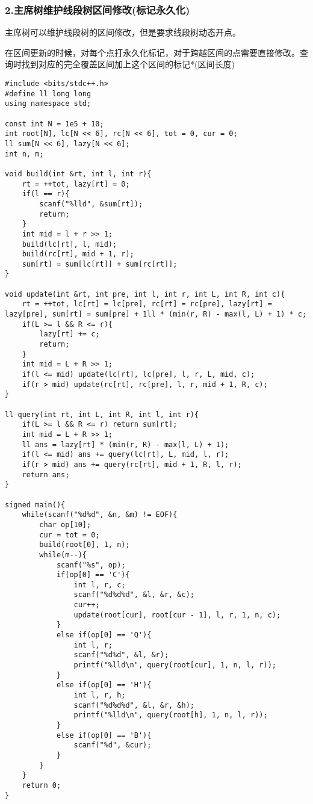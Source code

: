 \documentclass[]{article}
\begin{document}
\hypertarget{ux4e3bux5e2dux6811ux7ef4ux62a4ux7ebfux6bb5ux6811ux533aux95f4ux4feeux6539ux6807ux8bb0ux6c38ux4e45ux5316}{%
\subsubsection{2.主席树维护线段树区间修改(标记永久化)}\label{ux4e3bux5e2dux6811ux7ef4ux62a4ux7ebfux6bb5ux6811ux533aux95f4ux4feeux6539ux6807ux8bb0ux6c38ux4e45ux5316}}

主席树可以维护线段树的区间修改，但是要求线段树动态开点。

在区间更新的时候，对每个点打永久化标记，对于跨越区间的点需要直接修改。查询时找到对应的完全覆盖区间加上这个区间的标记*(区间长度)

\begin{verbatim}
#include <bits/stdc++.h>
#define ll long long
using namespace std;

const int N = 1e5 + 10;
int root[N], lc[N << 6], rc[N << 6], tot = 0, cur = 0;
ll sum[N << 6], lazy[N << 6];
int n, m;

void build(int &rt, int l, int r){
    rt = ++tot, lazy[rt] = 0;
    if(l == r){
        scanf("%lld", &sum[rt]);
        return;
    }
    int mid = l + r >> 1;
    build(lc[rt], l, mid);
    build(rc[rt], mid + 1, r);
    sum[rt] = sum[lc[rt]] + sum[rc[rt]];
}

void update(int &rt, int pre, int l, int r, int L, int R, int c){
    rt = ++tot, lc[rt] = lc[pre], rc[rt] = rc[pre], lazy[rt] = lazy[pre], sum[rt] = sum[pre] + 1ll * (min(r, R) - max(l, L) + 1) * c;
    if(L >= l && R <= r){
        lazy[rt] += c;
        return;
    }
    int mid = L + R >> 1;
    if(l <= mid) update(lc[rt], lc[pre], l, r, L, mid, c);
    if(r > mid) update(rc[rt], rc[pre], l, r, mid + 1, R, c);
}

ll query(int rt, int L, int R, int l, int r){
    if(L >= l && R <= r) return sum[rt];
    int mid = L + R >> 1;
    ll ans = lazy[rt] * (min(r, R) - max(l, L) + 1);
    if(l <= mid) ans += query(lc[rt], L, mid, l, r);
    if(r > mid) ans += query(rc[rt], mid + 1, R, l, r);
    return ans;
}

signed main(){
    while(scanf("%d%d", &n, &m) != EOF){
        char op[10]; 
        cur = tot = 0;
        build(root[0], 1, n);
        while(m--){
            scanf("%s", op);           
            if(op[0] == 'C'){
                int l, r, c;
                scanf("%d%d%d", &l, &r, &c);
                cur++;
                update(root[cur], root[cur - 1], l, r, 1, n, c);
            }
            else if(op[0] == 'Q'){
                int l, r;
                scanf("%d%d", &l, &r);
                printf("%lld\n", query(root[cur], 1, n, l, r));
            }
            else if(op[0] == 'H'){
                int l, r, h;
                scanf("%d%d%d", &l, &r, &h);
                printf("%lld\n", query(root[h], 1, n, l, r));
            }
            else if(op[0] == 'B'){
                scanf("%d", &cur);
            }
        }
    }
    return 0; 
}
\end{verbatim}
\end{document}
